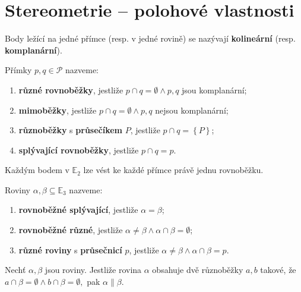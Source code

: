\section{Stereometrie -- polohové vlastnosti}

\begin{definition}
    Body ležící na jedné přímce (resp. v jedné rovině) se nazývají \textbf{kolineární}
    (resp. \textbf{komplanární}).
\end{definition}

\begin{definition}
    Přímky $p,q \in \mathscr P$ nazveme:
    \begin{enumerate}[$i.$]
        \item \textbf{různé rovnoběžky}, jestliže $p\cap q = \emptyset \land
            p,q$ jsou komplanární;
        \item \textbf{mimoběžky}, jestliže $p\cap q = \emptyset \land p,q$ nejsou
            komplanární;
        \item \textbf{různoběžky} s \textbf{průsečíkem} $P$, jestliže $p\cap q =
            \left \{ P \right \} $;
       	\item \textbf{splývající rovnoběžky}, jestliže $p\cap q = p$.
    \end{enumerate}
\end{definition}

\begin{veta}
    Každým bodem v $\mathbb E_2$ lze vést ke každé přímce právě jednu rovnoběžku.
\end{veta}

\begin{definition}
    Roviny $\alpha,\beta \subseteq \mathbb E_3$ nazveme:
    \begin{enumerate}[$i.$]
        \item \textbf{rovnoběžné splývající}, jestliže $\alpha = \beta$;
        \item \textbf{rovnoběžné různé}, jestliže $\alpha \ne \beta \land \alpha \cap
        \beta = \emptyset$;
        \item \textbf{různé roviny} s \textbf{průsečnicí} $p$, jestliže $\alpha
        \ne \beta \land \alpha \cap \beta = p$.
    \end{enumerate}
\end{definition}

\begin{veta}
    Nechť $\alpha, \beta$ jsou roviny. Jestliže rovina $\alpha$ obsahuje dvě různoběžky
    $a,b$ takové, že $a\cap \beta = \emptyset \land b \cap \beta = \emptyset,$
    pak $\alpha \parallel \beta.$
\end{veta}

